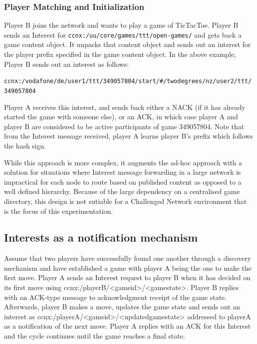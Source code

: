\documentclass[a4paper,12pt]{report}      %
\begin{document}
\begin{descripton}
\subsubsection{Player Matching and Initialization}

Player B joins the network and wants to play a game of TicTacToe. Player B sends an Interest for
\verb!ccnx:/uu/core/games/ttt/open-games/! and gets back a game content object. It unpacks that content
object and sends out an interest for the player prefix specified in the game content object. In the above
example, Player B sends out an interest as follows:

\verb!ccnx:/vodafone/de/user1/ttt/349057804/start/#/twodegrees/nz/user2/ttt/349057804!

Player A receives this interest, and sends back either a NACK (if it has already started the game with
someone else), or an ACK, in which case player A and player B are considered to be active participants
of game 349057804. Note that from the Interest message received, player A learns player B's prefix
which follows the hash sign.

While this approach is more complex, it augments the ad-hoc approach with a solution for situations
where Interest message forwarding in a large network is impractical for each node to route based on
published content as opposed to a well defined hierarchy. Because of the large dependency on a centralised game directory, 
this design is not sutiable for a Challenged Network environment that is the focus of this experimentation. 

\subsection{Interests as a notification mechanism}

Assume that two players have successfully found one another through a discovery mechanism and
have established a game with player A being the one to make the first move. Player A sends an Interest
request to player B when it has decided on its first move using ccnx:/playerB/<gameid>/<gamestate>.
Player B replies with an ACK-type message to acknowledgment receipt of the game state. Afterwards,
player B makes a move, updates the game state and sends out an interest as
ccnx:/playerA/<gameid>/<updatedgamestate> addressed to playerA as a notification of the next move.
Player A replies with an ACK for this Interest and the cycle continues until the game reaches a final
state.


\end{descripton}
\end{document}
